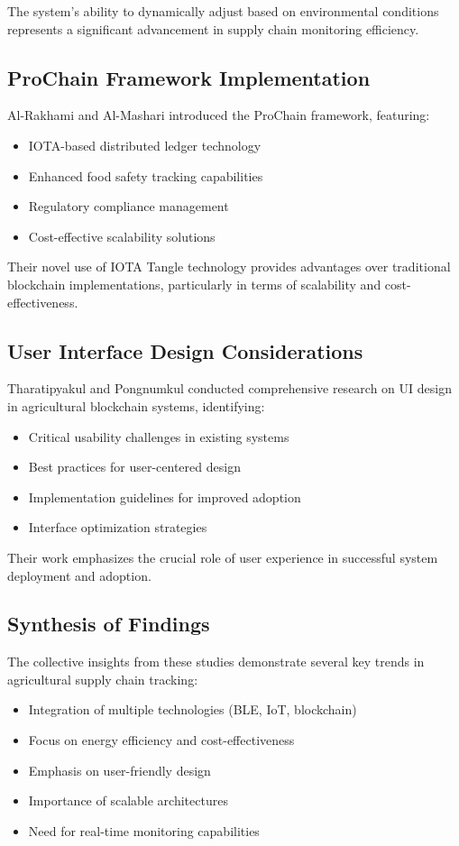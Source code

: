 \documentclass[conference]{IEEEtran}
\begin{document}
The system's ability to dynamically adjust based on environmental conditions represents a significant advancement in supply chain monitoring efficiency.

\subsection{ProChain Framework Implementation}
Al-Rakhami and Al-Mashari \cite{al2021prochain} introduced the ProChain framework, featuring:
\begin{itemize}
    \item IOTA-based distributed ledger technology
    \item Enhanced food safety tracking capabilities
    \item Regulatory compliance management
    \item Cost-effective scalability solutions
\end{itemize}

Their novel use of IOTA Tangle technology provides advantages over traditional blockchain implementations, particularly in terms of scalability and cost-effectiveness.

\subsection{User Interface Design Considerations}
Tharatipyakul and Pongnumkul \cite{tharatipyakul2021user} conducted comprehensive research on UI design in agricultural blockchain systems, identifying:
\begin{itemize}
    \item Critical usability challenges in existing systems
    \item Best practices for user-centered design
    \item Implementation guidelines for improved adoption
    \item Interface optimization strategies
\end{itemize}

Their work emphasizes the crucial role of user experience in successful system deployment and adoption.

\subsection{Synthesis of Findings}
The collective insights from these studies demonstrate several key trends in agricultural supply chain tracking:
\begin{itemize}
    \item Integration of multiple technologies (BLE, IoT, blockchain)
    \item Focus on energy efficiency and cost-effectiveness
    \item Emphasis on user-friendly design
    \item Importance of scalable architectures
    \item Need for real-time monitoring capabilities
\end{itemize}
\end{document}
